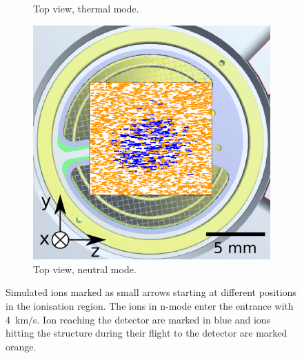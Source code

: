 \begin{figure}[h]
\begin{subfigure}[b]{.5\textwidth}
			\caption{Top view, thermal mode.}
			\label{fig:PFMentrSideTopSimThTop}
		\end{subfigure}
		\begin{subfigure}[b]{.5\textwidth}
			\centering
			\includegraphics[width=.8\textwidth]{Experiments/PFMEntrance_Top_nSim.png}
			\caption{Top view, neutral mode.}
		\end{subfigure}
		\caption{Simulated ions marked as small arrows starting at different positions in the ionisation region. The ions in n-mode enter the entrance with 4~km/s. Ion reaching the detector are marked in blue and ions hitting the structure during their flight to the detector are marked orange.}
		\label{fig:PFMentrSideTopSimthnMode}
	\end{figure}
